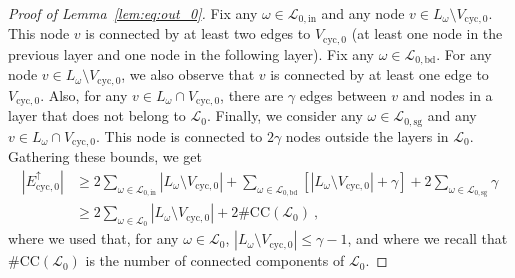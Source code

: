 \documentclass[10pt,a4paper]{amsart}
\begin{document}
\begin{proof}[Proof of Lemma~\ref{lem:eq:out_0}]
Fix any $\omega\in \mathcal{L}_{0,\mathrm{in}}$ and any node $v\in L_\omega\setminus V_{\mathrm{cyc},0}$. This node $v$ is connected by at least two edges to $V_{\mathrm{cyc},0}$ (at least one node in the previous layer and one node in the following layer). Fix any $\omega\in\mathcal{L}_{0,\mathrm{bd}}$. For any node $v\in L_\omega\setminus V_{\mathrm{cyc},0}$, we also observe that $v$ is connected by at least one edge to $V_{\mathrm{cyc},0}$. Also, for any $v\in L_{\omega}\cap V_{\mathrm{cyc},0}$, there are $\gamma$ edges between $v$ and nodes in a layer that does not belong to $\mathcal{L}_0$. Finally, we consider any $\omega\in \mathcal{L}_{0,\mathrm{sg}}$  and any $v\in L_{\omega}\cap V_{\mathrm{cyc},0}$. This node is connected to $2\gamma$ nodes outside the layers in $\mathcal{L}_0$. Gathering these bounds, we get
\begin{align}\nonumber
|E_{\mathrm{cyc},0}^{\uparrow}|&\geq 2 \sum_{\omega\in\mathcal{L}_{0,\mathrm{in}}}|L_{\omega}\setminus V_{\mathrm{cyc},0}|+ \sum_{\omega\in\mathcal{L}_{0,\mathrm{bd}}}[|L_{\omega}\setminus V_{\mathrm{cyc},0}| + \gamma]  +  2\sum_{\omega\in\mathcal{L}_{0,\mathrm{sg}}}\gamma  \\
& \geq 2 \sum_{\omega\in\mathcal{L}_{0}}|L_{\omega}\setminus V_{\mathrm{cyc},0}| + 2\#\mathrm{CC}(\mathcal L_0)\  , \label{eq:lower:E:cyc,0,up}
\end{align}
where we used that, for any $\omega\in \mathcal{L}_{0}$, $|L_{\omega}\setminus V_{\mathrm{cyc},0}|\leq \gamma - 1$, and where we recall that $\#\mathrm{CC}(\mathcal L_0)$ is the number of connected components of $\mathcal{L}_0$. 

\smallskip 



\end{proof}
\end{document}
